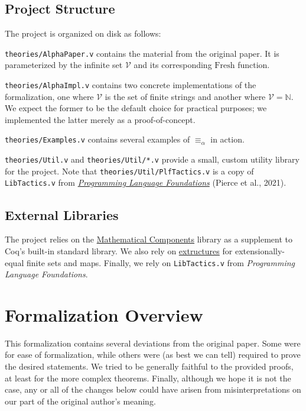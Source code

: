 \documentclass{article}
\begin{document}
\subsection{Project Structure}

The project is organized on disk as follows:

\verb|theories/AlphaPaper.v| contains the material from the original paper. It is parameterized by the
infinite set $\mathcal{V}$ and its corresponding $\textrm{Fresh}$ function.

\verb|theories/AlphaImpl.v| contains two concrete implementations of the formalization, one where
$\mathcal{V}$ is the set of finite strings and another where $\mathcal{V} = \mathbb{N}$. We expect
the former to be the default choice for practical purposes; we implemented the latter merely as a
proof-of-concept.

\verb|theories/Examples.v| contains several examples of $\equiv_\alpha$ in action.

\verb|theories/Util.v| and \verb|theories/Util/*.v| provide a small, custom utility library for the
project. Note that \verb|theories/Util/PlfTactics.v| is a copy of \verb|LibTactics.v| from
\href{https://softwarefoundations.cis.upenn.edu/plf-current/}{\emph{Programming Language
Foundations}} (Pierce et al., 2021).

\subsection{External Libraries}

The project relies on the \href{https://math-comp.github.io}{Mathematical Components} library as a
supplement to Coq's built-in standard library. We also rely on
\href{https://github.com/arthuraa/extructures}{extructures} for extensionally-equal finite sets and
maps. Finally, we rely on \verb|LibTactics.v| from \emph{Programming Language Foundations}.

\section{Formalization Overview}

This formalization contains several deviations from the original paper. Some were for ease of
formalization, while others were (as best we can tell) required to prove the desired statements. We
tried to be generally faithful to the provided proofs, at least for the more complex theorems.
Finally, although we hope it is not the case, any or all of the changes below could have arisen from
misinterpretations on our part of the original author's meaning.
\end{document}
